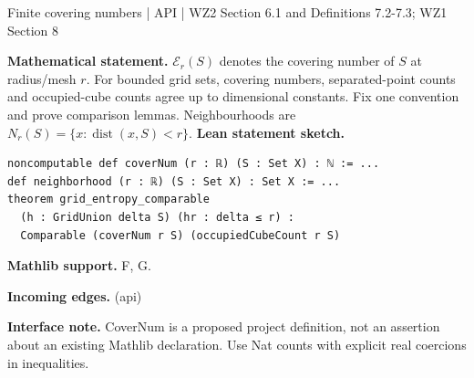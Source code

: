 \documentclass[10pt,a4paper]{article}
\newcommand{\nodecard}[1]{\hyperlink{node-#1}{\texttt{\detokenize{#1}}}}
\begin{document}
\begin{minipage}{\linewidth}
\hypertarget{node-Ientropy}{}
\begin{tcolorbox}[colback=white,colframe=apifg,colbacktitle=apibg,coltitle=ink,boxrule=0.45pt,arc=1.6mm,left=3mm,right=3mm,top=2mm,bottom=2mm,title={\sffamily\bfseries Entropy API \hfill \texttt{Ientropy}}]
{\sffamily\small\color{muted}Finite covering numbers | API | WZ2 Section 6.1 and Definitions 7.2-7.3; WZ1 Section 8}\par
\textbf{Mathematical statement.} $\mathcal E_r(S)$ denotes the covering number of $S$ at radius/mesh $r$.
For bounded grid sets, covering numbers, separated-point counts and occupied-cube counts agree up to dimensional constants. Fix one convention and prove comparison lemmas. Neighbourhoods are $N_r(S)=\{x:\operatorname{dist}(x,S)<r\}$.
\smallskip\textbf{Lean statement sketch.}
\begin{Verbatim}[fontsize=\small,breaklines=true,breakanywhere=true,tabsize=2]
noncomputable def coverNum (r : ℝ) (S : Set X) : ℕ := ...
def neighborhood (r : ℝ) (S : Set X) : Set X := ...
theorem grid_entropy_comparable
  (h : GridUnion delta S) (hr : delta ≤ r) :
  Comparable (coverNum r S) (occupiedCubeCount r S)
\end{Verbatim}
{\footnotesize\textbf{Mathlib support.} F, G.\par
\textbf{Incoming edges.} \nodecard{Igeom} (api)\par}
{\footnotesize\textbf{Interface note.} CoverNum is a proposed project definition, not an assertion about an existing Mathlib declaration. Use Nat counts with explicit real coercions in inequalities.}
\end{tcolorbox}\end{minipage}\par\medskip
\end{document}
